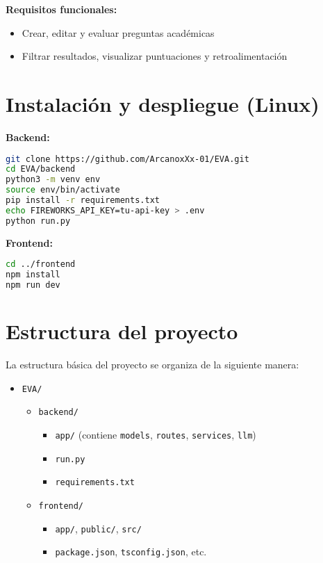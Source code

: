 \documentclass[12pt]{article}
\begin{document}
\textbf{Requisitos funcionales:}
\begin{itemize}
  \item Crear, editar y evaluar preguntas académicas
  \item Filtrar resultados, visualizar puntuaciones y retroalimentación
\end{itemize}

\section{Instalación y despliegue (Linux)}
\textbf{Backend:}
\begin{lstlisting}[language=bash]
git clone https://github.com/ArcanoxXx-01/EVA.git
cd EVA/backend
python3 -m venv env
source env/bin/activate
pip install -r requirements.txt
echo FIREWORKS_API_KEY=tu-api-key > .env
python run.py
\end{lstlisting}

\textbf{Frontend:}
\begin{lstlisting}[language=bash]
cd ../frontend
npm install
npm run dev
\end{lstlisting}

\section{Estructura del proyecto}

La estructura básica del proyecto se organiza de la siguiente manera:

\begin{itemize}
  \item \texttt{EVA/}
  \begin{itemize}
    \item \texttt{backend/}
    \begin{itemize}
      \item \texttt{app/} \quad (contiene \texttt{models}, \texttt{routes}, \texttt{services}, \texttt{llm})
      \item \texttt{run.py}
      \item \texttt{requirements.txt}
    \end{itemize}
    \item \texttt{frontend/}
    \begin{itemize}
      \item \texttt{app/}, \texttt{public/}, \texttt{src/}
      \item \texttt{package.json}, \texttt{tsconfig.json}, etc.
    \end{itemize}
  \end{itemize}
\end{itemize}
\end{document}

